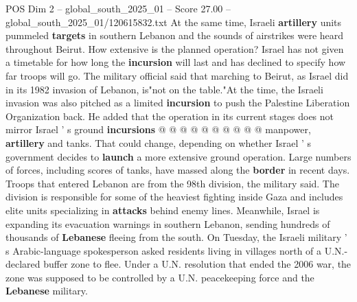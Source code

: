 \begin{textsample}{POS Dim 2 – global\_south\_2025\_01 – Score 27.00 – global\_south\_2025\_01/120615832.txt}
At the same time, Israeli \textbf{artillery} units pummeled \textbf{targets} in southern Lebanon and the sounds of airstrikes were heard throughout Beirut.
How extensive is the planned operation?
Israel has not given a timetable for how long the \textbf{incursion} will last and has declined to specify how far troops will go.
The military official said that marching to Beirut, as Israel did in its 1982 invasion of Lebanon, is"not on the table."At the time, the Israeli invasion was also pitched as a limited \textbf{incursion} to push the Palestine Liberation Organization back.
He added that the operation in its current stages does not mirror Israel ' s ground \textbf{incursions} @ @ @ @ @ @ @ @ @ @ manpower, \textbf{artillery} and tanks.
That could change, depending on whether Israel ' s government decides to \textbf{launch} a more extensive ground operation.
Large numbers of forces, including scores of tanks, have massed along the \textbf{border} in recent days.
Troops that entered Lebanon are from the 98th division, the military said.
The division is responsible for some of the heaviest fighting inside Gaza and includes elite units specializing in \textbf{attacks} behind enemy lines.
Meanwhile, Israel is expanding its evacuation warnings in southern Lebanon, sending hundreds of thousands of \textbf{Lebanese} fleeing from the south.
On Tuesday, the Israeli military ' s Arabic-language spokesperson asked residents living in villages north of a U.N.-declared buffer zone to flee.
Under a U.N. resolution that ended the 2006 war, the zone was supposed to be controlled by a U.N. peacekeeping force and the \textbf{Lebanese} military.

\end{textsample}
